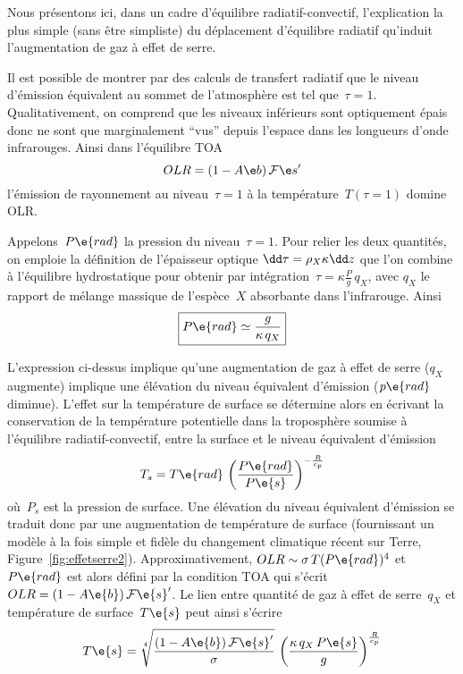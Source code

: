 



\sk
Nous présentons ici, dans un cadre d'équilibre radiatif-convectif, l'explication la plus simple (sans être simpliste) du déplacement
d'équilibre radiatif qu'induit l'augmentation de gaz à effet de serre.

\sk
Il est possible de montrer par des calculs de transfert radiatif que le niveau
d'émission équivalent au sommet de l'atmosphère est tel que~$\tau = 1$.
Qualitativement, on comprend que les niveaux inférieurs sont optiquement
épais donc ne sont que marginalement ``vus'' depuis l'espace dans les longueurs d'onde infrarouges.
Ainsi dans l'équilibre TOA
\[ \TOA \] 
\noindent l'émission de rayonnement au niveau~$\tau=1$ 
à la température~$T(\tau=1)$ domine OLR.

\sk
Appelons~$P\e{rad}$ la pression du niveau~$\tau=1$. 
Pour relier
les deux quantités, on emploie la définition de l'épaisseur optique
$\EO$ que l'on combine
à l'équilibre hydrostatique pour obtenir
par intégration~$\tau = \kappa \frac{P}{g} \, q_X$,
avec $q_X$ le rapport de mélange massique 
de l'espèce~$X$ absorbante dans l'infrarouge.
Ainsi
\[ \boxed{ P\e{rad} \simeq \frac{g}{\kappa \, q_X} } \]


\sk
L'expression ci-dessus implique qu'une augmentation de
gaz à effet de serre ($q_X$ augmente) implique une 
élévation du niveau équivalent d'émission
($p\e{rad}$ diminue).
L'effet sur la température de surface se détermine alors
en écrivant la conservation de la température potentielle
dans la troposphère soumise à l'équilibre radiatif-convectif,
entre la surface et le niveau équivalent d'émission
\[ T_s = T\e{rad} \, \left( \frac{P\e{rad}}{P\e{s}} \right)^{-\frac{R}{c_p}} \]
\noindent où~$P_s$ est la pression de surface.
Une élévation du niveau équivalent d'émission
se traduit donc par une augmentation
de température de surface (fournissant
un modèle à la fois simple et fidèle du 
changement climatique récent sur Terre, Figure~\ref{fig:effetserre2}). 
Approximativement, $OLR \sim \sigma \, T(P\e{rad})^4$
et~$P\e{rad}$ est alors défini par la 
condition TOA qui s'écrit~$OLR = (1-A\e{b}) \, \mathcal{F}\e{s}'$.
Le lien entre quantité de gaz à effet de serre~$q_X$
et température de surface~$T\e{s}$ peut ainsi s'écrire
\[ T\e{s} = \sqrt[4]{\frac{(1-A\e{b}) \, \mathcal{F}\e{s}'}{\sigma}} \, \left( \frac{\kappa \, q_X \,P\e{s}}{g} \right)^{\frac{R}{c_p}} \]
